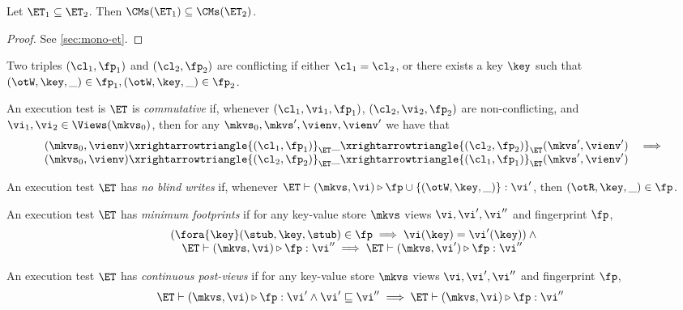 \begin{proposition}
\label{prop:mono-et}
Let $\ET_1 \subseteq \ET_2$. Then $\CMs(\ET_1) \subseteq \CMs(\ET_2)$.
\end{proposition}
\begin{proof}
    \ifTechReport
    
    \else
    See \cref{sec:mono-et}.
    \fi
\end{proof}

\begin{definition}
Two triples $(\cl_1, \fp_1)$ and $(\cl_2, \fp_2)$ are 
conflicting if either $\cl_1 = \cl_2$, or there exists a key $\key$ such that 
$(\otW, \key, \_) \in \fp_1, (\otW, \key, \_) \in \fp_2$. 

An execution test is $\ET$ is \emph{commutative} if, whenever $(\cl_1, \vi_1, \fp_1)$, 
$(\cl_2, \vi_2, \fp_2)$ are non-conflicting, and $\vi_1, \vi_2 \in \Views(\mkvs_0)$,  
then for any $\mkvs_0, \mkvs', \vienv, \vienv'$ we have that 
\[
\begin{array}{lr}
(\mkvs_0, \vienv) \xrightarrowtriangle{(\cl_1, \fp_1)}_{\ET} 
\_ \xrightarrowtriangle{(\cl_2, \fp_2)}_{\ET} (\mkvs', \vienv') &\implies \\
(\mkvs_0, \vienv) \xrightarrowtriangle{(\cl_2, \fp_2)}_{\ET} 
\_ \xrightarrowtriangle{(\cl_1, \fp_1)}_{\ET} (\mkvs', \vienv')
\end{array}
\]
\end{definition}

\begin{definition}
An execution test $\ET$ has \emph{no blind writes} if, whenever $\ET \vdash (\mkvs, \vi) \triangleright \fp \cup \{(\otW, \key, \_)\} : \vi'$, 
then $(\otR, \key, \_) \in \fp$.
\end{definition}

\begin{definition}
An execution test $\ET$ has \emph{minimum footprints} if for any key-value store \( \mkvs \)
views \( \vi, \vi',\vi''\) and fingerprint \( \fp \),
\[
\begin{array}{@{}l@{}}
    ( \fora{ \key} (\stub, \key, \stub) \in \fp \implies \vi(\key) = \vi'(\key) ) \land {} \\
    \quad \ET \vdash (\mkvs, \vi) \triangleright \fp : \vi'' \implies \ET \vdash (\mkvs, \vi') \triangleright \fp : \vi''
\end{array}
\]
\end{definition}

\begin{definition}
An execution test $\ET$ has \emph{continuous post-views} if for any key-value store \( \mkvs \)
views \( \vi, \vi',\vi''\) and fingerprint \( \fp \), 
\[
\begin{array}{@{}l@{}}
    \quad \ET \vdash (\mkvs, \vi) \triangleright \fp : \vi' \land \vi' \sqsubseteq \vi'' \implies \ET \vdash (\mkvs, \vi) \triangleright \fp : \vi''
\end{array}
\]
\end{definition}

